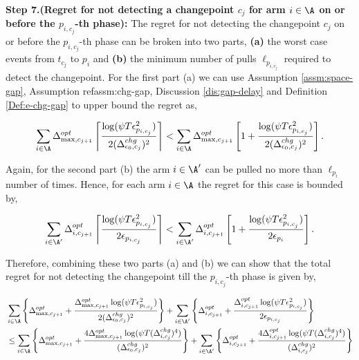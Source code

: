 \begin{customproof}{3}

\textbf{Step 7.(Regret for not detecting a changepoint $c_{j}$ for arm $i\in\A$ on or before the $p_{i,c_j}$-th phase):} The regret for not detecting the changepoint $c_j$ on or before the $p_{i,c_j}$-th phase can be broken into two parts, \textbf{(a)} the worst case events from $t_{c_j}$ to $p_{i}$ and \textbf{(b)} the minimum number of pulls $\ell_{p_{i,c_j}}$ required to detect the changepoint. For the first part (a) we can use Assumption \ref{assm:space-gap}, Assumption ref{assm:chg-gap}, Discussion \ref{dis:gap-delay} and Definition \ref{Def:e-chg-gap} to upper bound the regret as,

\begin{align*}
\sum_{i\in\A}\Delta^{opt}_{\max,c_{j+1}}\left\lceil \dfrac{\log(\psi T\epsilon_{p_{i,c_j}}^2)}{2(\Delta^{chg}_{\epsilon_0,c_j})^2} \right\rceil < \sum_{i\in\A}\Delta^{opt}_{\max,c_{j+1}}\left[ 1 + \dfrac{\log(\psi T\epsilon_{p_{i,c_j}}^2)}{2(\Delta^{chg}_{\epsilon_0,c_j})^2} \right].
\end{align*}

Again, for the second part (b) the arm $i\in\A'$ can be pulled no more than $\ell_{p_i}$ number of times. Hence, for each arm $i\in\A$  the regret for this case is bounded by,

\begin{align*}
\sum_{i\in\A'}\Delta^{opt}_{i,c_{j+1}}\left\lceil \dfrac{\log(\psi T\epsilon_{p_{i,c_j}}^2)}{2\epsilon_{p_{i,c_j}}} \right\rceil <  \sum_{i\in\A'}\Delta^{opt}_{i,c_{j+1}}\left[ 1 + \dfrac{\log(\psi T\epsilon_{p_{i,c_j}}^2)}{2\epsilon_{p_i}} \right].
\end{align*}

Therefore, combining these two parts (a) and (b) we can show that the total regret for not detecting the changepoint till the $p_{i,c_j}$-th phase is given by,

\begin{align*}
&\sum_{i\in\A}\left\lbrace\Delta^{opt}_{\max,c_{j+1}} + \dfrac{\Delta^{opt}_{\max,c_{j+1}}\log(\psi T\epsilon_{p_{i,c_j}}^2)}{2(\Delta^{chg}_{\epsilon_0,c_j})^2}\right\rbrace + \sum_{i\in\A'}\left\lbrace\Delta^{opt}_{i,c_{j+1}} + \dfrac{\Delta^{opt}_{i,c_{j+1}}\log(\psi T\epsilon_{p_{i,c_j}}^2)}{2\epsilon_{p_{i,c_j}}}\right\rbrace \\
&\leq \sum_{i\in\A}\left\lbrace\Delta^{opt}_{\max,c_{j+1}} + \dfrac{4\Delta^{opt}_{\max,c_{j+1}}\log(\psi T(\Delta^{chg}_{i,c_j})^4)}{(\Delta^{chg}_{\epsilon_0,c_j})^2} \right\rbrace + \sum_{i\in\A'}\left\lbrace \Delta^{opt}_{i,c_{j+1}} + \dfrac{4\Delta^{opt}_{i,c_{j+1}}\log(\psi T(\Delta^{chg}_{i,c_j})^4)}{(\Delta^{chg}_{i,c_j})^2}\right\rbrace
\end{align*}


\end{customproof}
